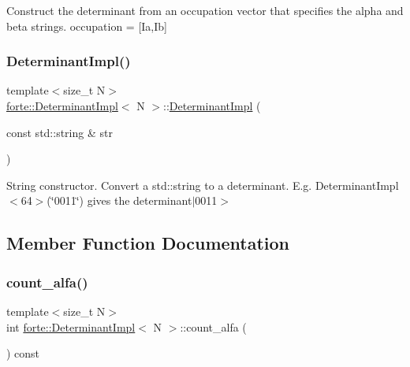 Construct the determinant from an occupation vector that specifies the alpha and beta strings. occupation = \mbox{[}Ia,Ib\mbox{]} \mbox{\label{classforte_1_1_determinant_impl_a85f7530da66f7fb1a649be1ad69b0e94}} 
\subsubsection{\texorpdfstring{Determinant\+Impl()}{DeterminantImpl()}\hspace{0.1cm}{\footnotesize\ttfamily [4/4]}}
{\footnotesize\ttfamily template$<$size\+\_\+t N$>$ \\
\mbox{\hyperlink{classforte_1_1_determinant_impl}{forte\+::\+Determinant\+Impl}}$<$ N $>$\+::\mbox{\hyperlink{classforte_1_1_determinant_impl}{Determinant\+Impl}} (\begin{DoxyParamCaption}\item[{const std\+::string \&}]{str }\end{DoxyParamCaption})\hspace{0.3cm}{\ttfamily [inline]}}

String constructor. Convert a std\+::string to a determinant. E.\+g. Determinant\+Impl$<$64$>$(\char`\"{}0011\char`\"{}) gives the determinant$\vert$0011$>$ 

\subsection{Member Function Documentation}
\mbox{\label{classforte_1_1_determinant_impl_abfc420df71d4fa00dcbf239a3b425f62}} 
\subsubsection{\texorpdfstring{count\+\_\+alfa()}{count\_alfa()}}
{\footnotesize\ttfamily template$<$size\+\_\+t N$>$ \\
int \mbox{\hyperlink{classforte_1_1_determinant_impl}{forte\+::\+Determinant\+Impl}}$<$ N $>$\+::count\+\_\+alfa (\begin{DoxyParamCaption}{ }\end{DoxyParamCaption}) const\hspace{0.3cm}{\ttfamily [inline]}}



